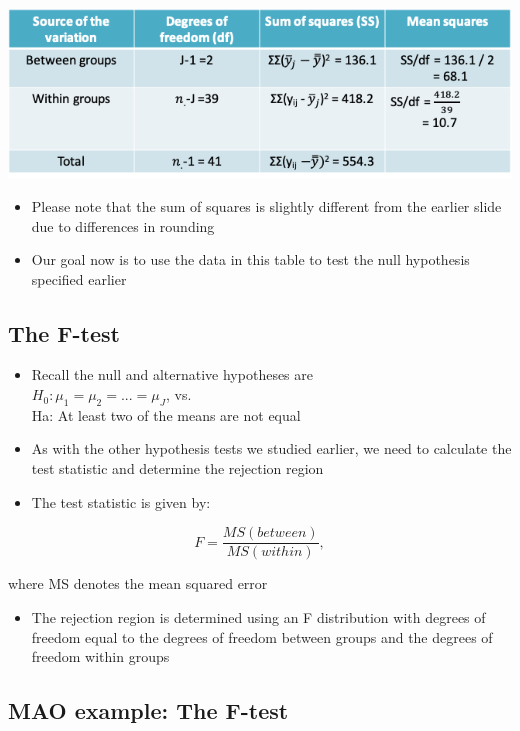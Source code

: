 \documentclass[
]{book}
\providecommand{\tightlist}{%
  \setlength{\itemsep}{0pt}\setlength{\parskip}{0pt}}
\begin{document}
\includegraphics[width=1\linewidth]{./10_31}

\begin{itemize}
\tightlist
\item
  Please note that the sum of squares is slightly different from the earlier slide due to differences in rounding
\item
  Our goal now is to use the data in this table to test the null hypothesis specified earlier
\end{itemize}

\hypertarget{the-f-test}{%
\subsection{The F-test}\label{the-f-test}}

\begin{itemize}
\tightlist
\item
  Recall the null and alternative hypotheses are\\
  \(H_0:\mu_1=\mu_2=...=\mu_J\), vs.\\
  Ha: At least two of the means are not equal
\item
  As with the other hypothesis tests we studied earlier, we need to calculate the test statistic and determine the rejection region
\item
  The test statistic is given by:
\end{itemize}

\[F=\frac{MS(between)}{MS(within)},\]

where MS denotes the mean squared error

\begin{itemize}
\tightlist
\item
  The rejection region is determined using an F distribution with degrees of freedom equal to the degrees of freedom between groups and the degrees of freedom within groups
\end{itemize}

\hypertarget{mao-example-the-f-test}{%
\subsection{MAO example: The F-test}\label{mao-example-the-f-test}}
\end{document}
